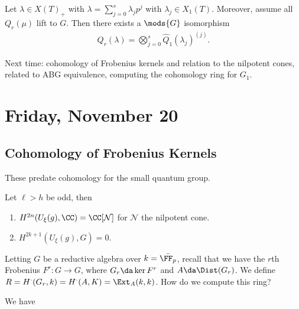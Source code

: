 \begin{corollary}[?]

Let \(\lambda \in X(T)_+\) with \(\lambda = \sum_{j=0}^s \lambda_j p^j\)
with \(\lambda_j \in X_1(T)\). Moreover, assume all \(Q_r(\mu)\) lift to
\(G\). Then there exists a \(\mods{G}\) isomorphism
\begin{align*}  
Q_r(\lambda) = \bigotimes_{j=0}^s \hat Q_1(\lambda_j)^{(j)}
.\end{align*}

\end{corollary}

Next time: cohomology of Frobenius kernels and relation to the nilpotent
cones, related to ABG equivalence, computing the cohomology ring for
\(G_1\).

\hypertarget{friday-november-20}{%
\section{Friday, November 20}\label{friday-november-20}}

\hypertarget{cohomology-of-frobenius-kernels}{%
\subsection{Cohomology of Frobenius
Kernels}\label{cohomology-of-frobenius-kernels}}

These predate cohomology for the small quantum group.

\begin{theorem}

Let \(\ell > h\) be odd, then

\begin{enumerate}
\def\labelenumi{\arabic{enumi}.}
\item
  \(H^{2n}(U_\xi(g), \CC ) = \CC[\mathcal{N}]\) for \(\mathcal{N}\) the
  nilpotent cone.
\item
  \(H^{2k+1}(U_\xi(g), G) = 0\).
\end{enumerate}

\end{theorem}

Letting \(G\) be a reductive algebra over \(k = \bar{\FF_p}\), recall
that we have the \(r\)th Frobenius \(F^r:G\to G\), where
\(G_r \da \ker F^r\) and \(A \da \Dist(G_r)\). We define
\(R = H^\cdot(G_r, k) = H^\cdot(A, K) = \Ext_A(k, k)\). How do we
compute this ring?

We have

\begin{center}\end{center}

